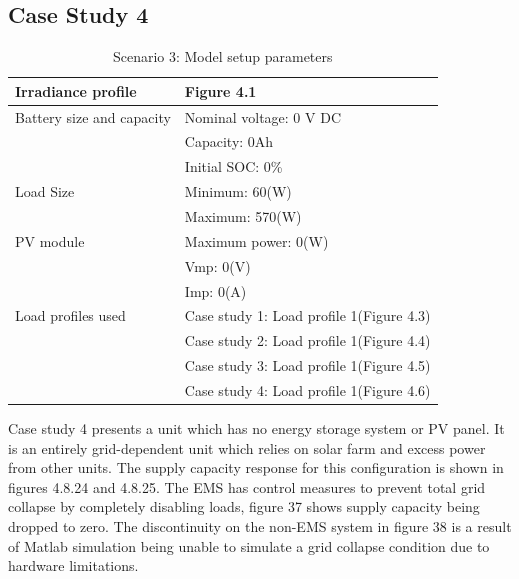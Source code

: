\subsection{Case Study 4}
\begin{table}[!ht]
	\begin{center}
		\caption{Scenario 3: Model setup parameters}
		\begin{tabular}{|p{6cm}|p{8cm}|} %
			\hline
			\textbf{Irradiance profile } & \textbf{Figure 4.1}\\
			\hline
			Battery size and capacity	& Nominal voltage: 0 V DC \\
			& Capacity: 0Ah\\
			& Initial SOC: 0\% \\
			\hline
			Load Size 					& Minimum: 60(W)\\
			& Maximum: 570(W)\\
			\hline
			PV module		 			& Maximum power: 0(W)\\
			& Vmp: 0(V)\\
			& Imp: 0(A)\\
			\hline
			Load profiles used & Case study 1: Load profile 1(Figure 4.3)\\
				 			   & Case study 2: Load profile 1(Figure 4.4)\\
				 			   & Case study 3: Load profile 1(Figure 4.5)\\
				 			   & Case study 4: Load profile 1(Figure 4.6)\\
			\hline
		\end{tabular}
	\end{center}
\end{table}

Case study 4 presents a unit which has no energy storage system or PV panel. It is an entirely grid-dependent unit which relies on solar farm and excess power from other units. The supply capacity response for this configuration is shown in figures 4.8.24 and 4.8.25. The EMS has control measures to prevent total grid collapse by completely disabling loads, figure 37 shows supply capacity being dropped to zero. The discontinuity on the non-EMS system in figure 38 is a result of Matlab simulation being unable to simulate a grid collapse condition due to hardware limitations.

